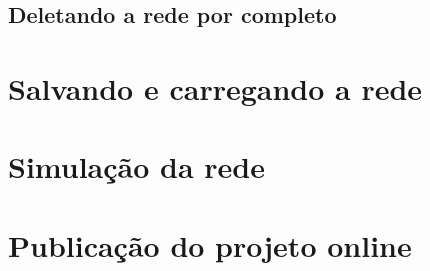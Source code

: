 \documentclass[
	12pt,				%
	openright,			%
	oneside,			%
	a4paper,			%
	english,			%
	brazil				%
	]{abntex2}
\begin{document}
\subsection*{Deletando a rede por completo}

\section{Salvando e carregando a rede}

\section{Simulação da rede} \label{cap:simulation}

\section{Publicação do projeto online}






\end{document}
